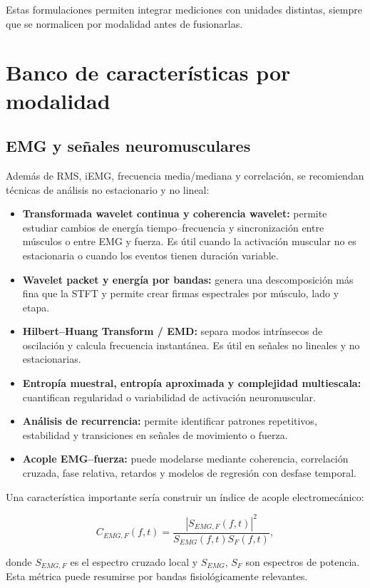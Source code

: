 \documentclass[conference]{IEEEtran}
\begin{document}
Estas formulaciones permiten integrar mediciones con unidades distintas, siempre que se normalicen por modalidad antes de fusionarlas.

\section{Banco de características por modalidad}
\subsection{EMG y señales neuromusculares}
Además de RMS, iEMG, frecuencia media/mediana y correlación, se recomiendan técnicas de análisis no estacionario y no lineal:

\begin{itemize}[leftmargin=*]
    \item \textbf{Transformada wavelet continua y coherencia wavelet:} permite estudiar cambios de energía tiempo--frecuencia y sincronización entre músculos o entre EMG y fuerza. Es útil cuando la activación muscular no es estacionaria o cuando los eventos tienen duración variable.
    \item \textbf{Wavelet packet y energía por bandas:} genera una descomposición más fina que la STFT y permite crear firmas espectrales por músculo, lado y etapa.
    \item \textbf{Hilbert--Huang Transform / EMD:} separa modos intrínsecos de oscilación y calcula frecuencia instantánea. Es útil en señales no lineales y no estacionarias.
    \item \textbf{Entropía muestral, entropía aproximada y complejidad multiescala:} cuantifican regularidad o variabilidad de activación neuromuscular.
    \item \textbf{Análisis de recurrencia:} permite identificar patrones repetitivos, estabilidad y transiciones en señales de movimiento o fuerza.
    \item \textbf{Acople EMG--fuerza:} puede modelarse mediante coherencia, correlación cruzada, fase relativa, retardos y modelos de regresión con desfase temporal.
\end{itemize}

Una característica importante sería construir un índice de acople electromecánico:

\begin{equation}
C_{EMG,F}(f,t) = \frac{|S_{EMG,F}(f,t)|^2}{S_{EMG}(f,t)S_F(f,t)},
\end{equation}

donde $S_{EMG,F}$ es el espectro cruzado local y $S_{EMG}$, $S_F$ son espectros de potencia. Esta métrica puede resumirse por bandas fisiológicamente relevantes.
\end{document}
